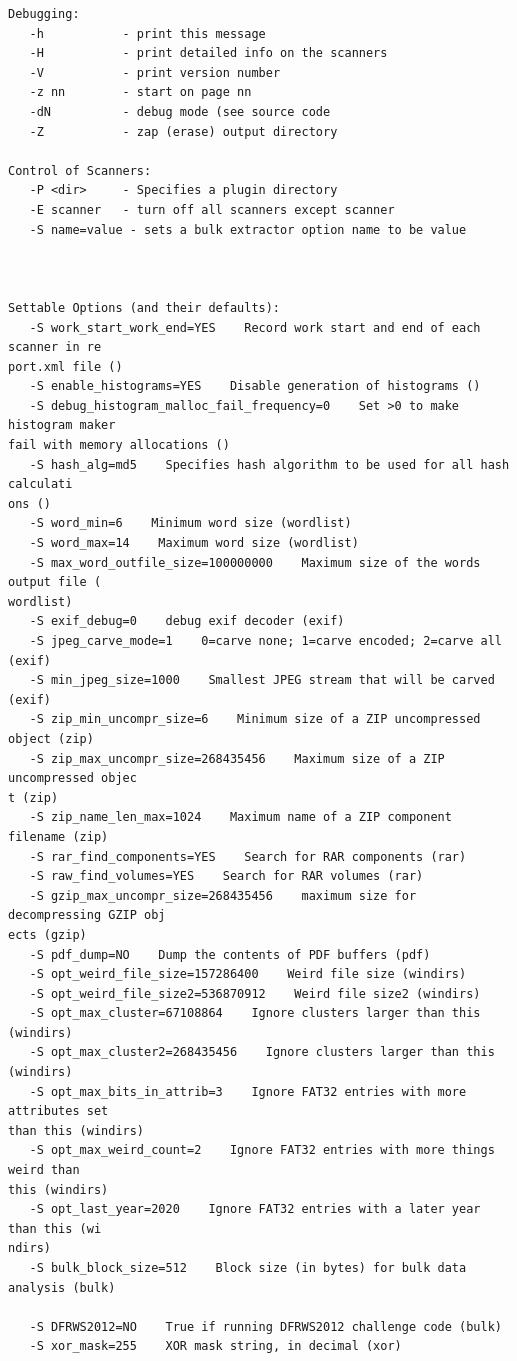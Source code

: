 \documentclass[11pt]{article} %
\begin{document}
\begin{Verbatim}[fontfamily=courier]
Debugging:
   -h           - print this message
   -H           - print detailed info on the scanners
   -V           - print version number
   -z nn        - start on page nn
   -dN          - debug mode (see source code
   -Z           - zap (erase) output directory

Control of Scanners:
   -P <dir>     - Specifies a plugin directory
   -E scanner   - turn off all scanners except scanner
   -S name=value - sets a bulk extractor option name to be value



Settable Options (and their defaults):
   -S work_start_work_end=YES    Record work start and end of each scanner in re
port.xml file ()
   -S enable_histograms=YES    Disable generation of histograms ()
   -S debug_histogram_malloc_fail_frequency=0    Set >0 to make histogram maker
fail with memory allocations ()
   -S hash_alg=md5    Specifies hash algorithm to be used for all hash calculati
ons ()
   -S word_min=6    Minimum word size (wordlist)
   -S word_max=14    Maximum word size (wordlist)
   -S max_word_outfile_size=100000000    Maximum size of the words output file (
wordlist)
   -S exif_debug=0    debug exif decoder (exif)
   -S jpeg_carve_mode=1    0=carve none; 1=carve encoded; 2=carve all (exif)
   -S min_jpeg_size=1000    Smallest JPEG stream that will be carved (exif)
   -S zip_min_uncompr_size=6    Minimum size of a ZIP uncompressed object (zip)
   -S zip_max_uncompr_size=268435456    Maximum size of a ZIP uncompressed objec
t (zip)
   -S zip_name_len_max=1024    Maximum name of a ZIP component filename (zip)
   -S rar_find_components=YES    Search for RAR components (rar)
   -S raw_find_volumes=YES    Search for RAR volumes (rar)
   -S gzip_max_uncompr_size=268435456    maximum size for decompressing GZIP obj
ects (gzip)
   -S pdf_dump=NO    Dump the contents of PDF buffers (pdf)
   -S opt_weird_file_size=157286400    Weird file size (windirs)
   -S opt_weird_file_size2=536870912    Weird file size2 (windirs)
   -S opt_max_cluster=67108864    Ignore clusters larger than this (windirs)
   -S opt_max_cluster2=268435456    Ignore clusters larger than this (windirs)
   -S opt_max_bits_in_attrib=3    Ignore FAT32 entries with more attributes set
than this (windirs)
   -S opt_max_weird_count=2    Ignore FAT32 entries with more things weird than
this (windirs)
   -S opt_last_year=2020    Ignore FAT32 entries with a later year than this (wi
ndirs)
   -S bulk_block_size=512    Block size (in bytes) for bulk data analysis (bulk)

   -S DFRWS2012=NO    True if running DFRWS2012 challenge code (bulk)
   -S xor_mask=255    XOR mask string, in decimal (xor)


\end{Verbatim}
\end{document}
